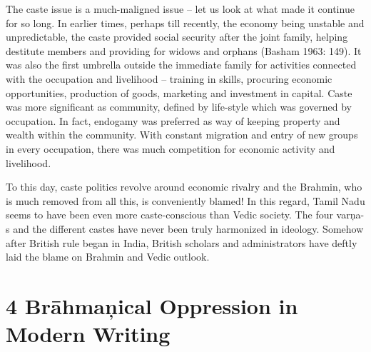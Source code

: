 \vskip 2pt

The caste issue is a much-maligned issue – let us look at what made it continue for so long. In earlier times, perhaps till recently, the economy being unstable and unpredictable, the caste provided social security after the joint family, helping destitute members and providing for widows and orphans (Basham 1963: 149). It was also the first umbrella outside the immediate family for activities connected with the occupation and livelihood – training in skills, procuring economic opportunities, production of goods, marketing and investment in capital. Caste was more significant as community, defined by life-style which was governed by occupation. In fact, endogamy was preferred as way of keeping property and wealth within the community. With constant migration and entry of new groups in every occupation, there was much competition for economic activity and livelihood.

\vskip 2pt

To this day, caste politics revolve around economic rivalry and the Brahmin, who is much removed from all this, is conveniently blamed! In this regard, Tamil Nadu seems to have been even more caste-conscious than Vedic society. The four varņa-s and the different castes have never been truly harmonized in ideology. Somehow after British rule began in India, British scholars and administrators have deftly laid the blame on Brahmin and Vedic outlook.


\section*{4 Brāhmaņical Oppression in Modern Writing}

\vskip 2pt

